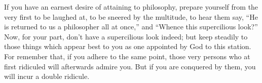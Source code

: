 If you have an earnest desire of attaining to philosophy, prepare
yourself from the very first to be laughed at, to be sneered by the
multitude, to hear them say, ``He is returned to us a philosopher
all at once,'' and ``Whence this supercilious look?'' Now, for your
part, don't have a supercilious look indeed; but keep steadily to
those things which appear best to you as one appointed by God to this
station. For remember that, if you adhere to the same point, those
very persons who at first ridiculed will afterwards admire you. But
if you are conquered by them, you will incur a double ridicule.

